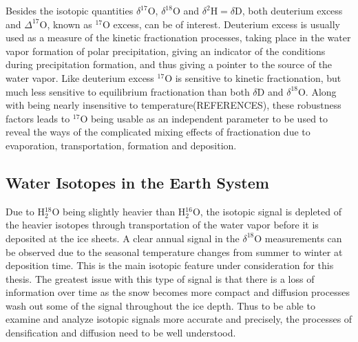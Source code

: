 \documentclass[../../CompleteThesis2/Complete_2ndDraft]{subfiles}
\begin{document}
Besides the isotopic quantities $\delta^{17}\text{O}$, $\delta^{18}\text{O}$ and $\delta^2\text{H} = \delta\text{D}$, both deuterium excess and $\Delta^{17}\text{O}$, known as $^{17}\text{O}$ excess, can be of interest. Deuterium excess is usually used as a measure of the kinetic fractionation processes, taking place in the water vapor formation of polar precipitation, giving an indicator of the conditions during precipitation formation, and thus giving a pointer to the source of the water vapor.
Like deuterium excess $^{17}\text{O}$ is sensitive to kinetic fractionation, but much less sensitive to equilibrium fractionation than both $\delta$D and $\delta^{18}$O. Along with being nearly insensitive to temperature(REFERENCES), these robustness factors leads to $^{17}$O being usable as an independent parameter to be used to reveal the ways of the complicated mixing effects of fractionation due to evaporation, transportation, formation and deposition.


\subsection[Relation to Temperature]{Water Isotopes in the Earth System}
\label{Subsec:Ice_WaterIsotopes_EarthSystem}


Due to H$_2^{18}$O being slightly heavier than H$_2^{16}$O, the isotopic signal is depleted of the heavier isotopes through transportation of the water vapor before it is deposited at the ice sheets. A clear annual signal in the $\delta^{18}$O measurements can be observed due to the seasonal temperature changes from summer to winter at deposition time. This is the main isotopic feature under consideration for this thesis. The greatest issue with this type of signal is that there is a loss of information over time as the snow becomes more compact and diffusion processes wash out some of the signal throughout the ice depth. Thus to be able to examine and analyze isotopic signals more accurate and precisely, the processes of densification and diffusion need to be well understood.

\end{document}

